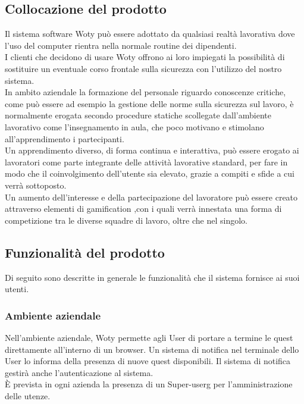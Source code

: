 \subsection{Collocazione del prodotto}

Il sistema software Woty può essere adottato da qualsiasi realtà lavorativa dove l’uso del computer rientra nella normale routine dei dipendenti. \\
I clienti che decidono di usare Woty offrono ai loro impiegati la possibilità di sostituire un eventuale corso frontale sulla sicurezza con l’utilizzo del nostro sistema.\\
In ambito aziendale la formazione del personale riguardo conoscenze critiche, come può essere ad esempio la gestione delle norme sulla sicurezza sul lavoro, è normalmente erogata secondo procedure statiche scollegate dall’ambiente lavorativo come l’insegnamento in aula, che poco motivano e stimolano all’apprendimento i partecipanti.\\
Un apprendimento diverso, di forma continua e interattiva, può essere erogato ai lavoratori come parte integrante delle attività lavorative standard, per fare in modo che il coinvolgimento dell’utente sia elevato, grazie a compiti e sfide a cui verrà sottoposto.\\
Un aumento dell’interesse e della partecipazione del lavoratore può essere creato attraverso elementi di gamification ,con i quali verrà innestata una forma di competizione tra le diverse squadre di lavoro, oltre che nel singolo.

\subsection{Funzionalità del prodotto}

Di seguito sono descritte in generale le funzionalità che il sistema fornisce ai suoi utenti.\\

\subsubsection{Ambiente aziendale}
Nell’ambiente aziendale, Woty permette agli User di portare a termine le quest direttamente all’interno di un browser. Un sistema di notifica nel terminale dello User lo informa della presenza di nuove quest disponibili. Il sistema di notifica gestirà anche l’autenticazione al sistema.\\ 
È prevista in ogni azienda la presenza di un Super-userg per l’amministrazione delle utenze.\\


